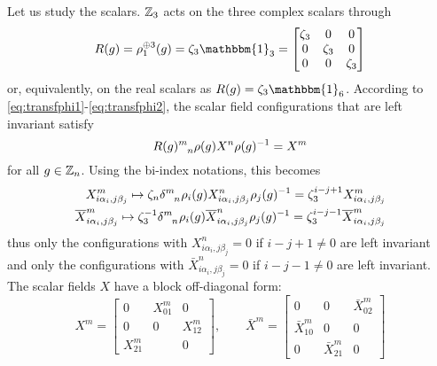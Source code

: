 \documentclass[a4paper,10pt]{article}
\begin{document}
            Let us study the scalars. $\mathbb{Z}_3$ acts on the three complex scalars through
            \begin{equation}
                R(g)= \rho^{\oplus 3}_1(g) = \zeta_3\mathbbm{1}_3 =
                \begin{bmatrix}
                    \zeta_3 & 0 & 0 \\
                    0 & \zeta_3 & 0 \\
                    0 & 0 & \zeta_3
                \end{bmatrix}
            \end{equation}
            or, equivalently, on the real scalars as $R(g)=\zeta_3\mathbbm{1}_6$. According to \eqref{eq:transfphi1}-\eqref{eq:transfphi2}, the scalar field configurations that are left invariant satisfy
            \begin{equation}
                R(g)\indices{^m_n}\rho(g)X^n\rho(g)^{-1}=X^m
            \end{equation}
            for all $g\in\mathbb{Z}_n$. Using the bi-index notations, this becomes
            \begin{align}
                X^m_{i\alpha_i,j\beta_j}\mapsto  \zeta_n\delta\indices{^m_n}\rho_i(g) X^n_{i\alpha_i,j\beta_j}\rho_j(g)^{-1} = \zeta^{i-j+1}_3X^m_{i\alpha_i,j\beta_j}\\
                \bar{X}^m_{i\alpha_i,j\beta_j}\mapsto  \zeta^{-1}_3\delta\indices{^m_n}\rho_i(g) \bar{X}^n_{i\alpha_i,j\beta_j}\rho_j(g)^{-1} = \zeta^{i-j-1}_3\bar{X}^m_{i\alpha_i,j\beta_j}
            \end{align}
            thus only the configurations with $X^n_{i\alpha_i,j\beta_j}=0$ if $i-j+1\neq0$ are left invariant and only the configurations with $\bar{X}^n_{i\alpha_i,j\beta_j}=0$ if $i-j-1\neq0$ are left invariant. The scalar fields $X$ have a block off-diagonal form:
            \begin{equation}
                X^m=
                \begin{bmatrix}
                    0 & X^m_{01} & 0 \\
                    0 & 0 & X^m_{12} \\
                    X^m_{21} & & 0
                \end{bmatrix},\qquad
                \bar{X}^m=
                \begin{bmatrix}
                    0 & 0 & \bar{X}^m_{02} \\
                    \bar{X}^m_{10} & 0 & 0 \\
                    0 & \bar{X}^m_{21} & 0
                \end{bmatrix}
            \end{equation}
\end{document}
